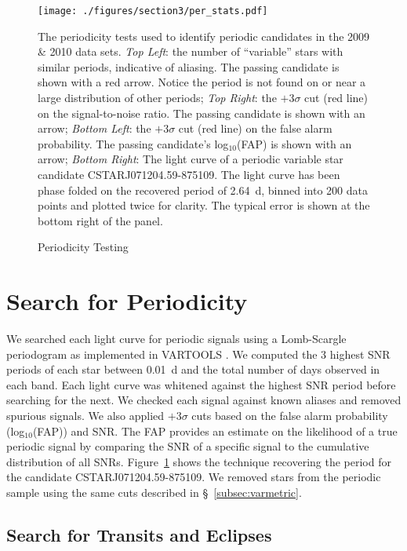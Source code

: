 \begin{figure}[H]
\begin{center}
\singlespace
\texttt{[image: ./figures/section3/per\_stats.pdf]}
\end{center}
\singlespace
\caption{Periodicity Testing}   The periodicity tests used to identify periodic candidates in the 2009 \& 2010 data sets. \textit{Top Left}: the number of ``variable'' stars with similar periods, indicative of aliasing. The passing candidate is shown with a red arrow. Notice the period is not found on or near a large distribution of other periods; \textit{Top Right}: the $+3\sigma$ cut (red line) on the signal-to-noise ratio. The passing candidate is shown with an arrow; \textit{Bottom Left}: the $+3\sigma$ cut (red line) on the false alarm probability. The passing candidate's log$_{10}$(FAP) is shown with an arrow; \textit{Bottom Right}: The light curve of a periodic variable star candidate CSTARJ071204.59-875109. The light curve has been phase folded on the recovered period of 2.64~d, binned into 200 data points and plotted twice for clarity. The typical error is shown at the bottom right of the panel. \label{fig:perd}
\end{figure}

\section{Search for Periodicity \label{subsec:permetric}}

We searched each light curve for periodic signals using a Lomb-Scargle periodogram \citep[LS]{Lomb, Scargle} as implemented in VARTOOLS \citep{Hartman2008}. We computed the 3 highest SNR periods of each star between 0.01~d and the total number of days observed in each band. Each light curve was whitened against the highest SNR period before searching for the next. We checked each signal against known aliases and removed spurious signals. We also applied $+3\sigma$ cuts based on the false alarm probability (log$_{10}$(FAP)) and SNR. The FAP provides an estimate on the likelihood of a true periodic signal by comparing the SNR of a specific signal to the cumulative distribution of all SNRs. Figure~\ref{fig:perd} shows the technique recovering the period for the candidate CSTARJ071204.59-875109. We removed stars from the periodic sample using the same cuts described in \S~\ref{subsec:varmetric}.

\subsection{Search for Transits and Eclipses}

